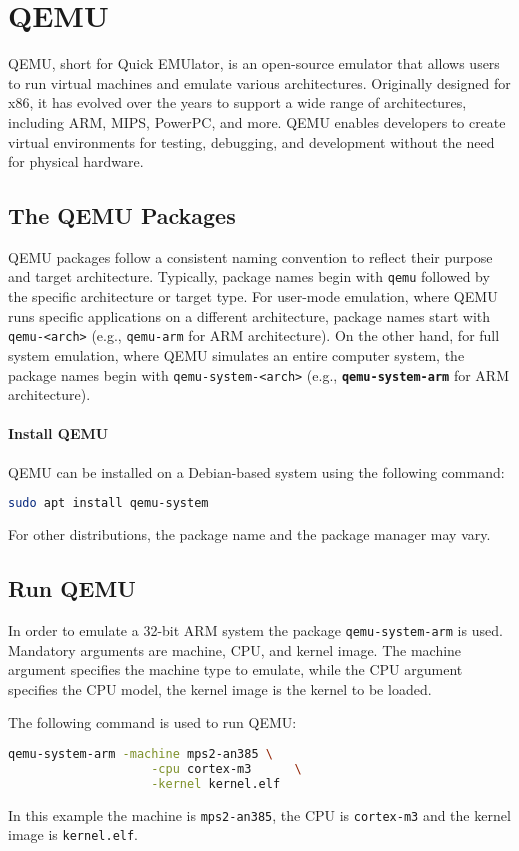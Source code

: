 \section{QEMU}
QEMU, short for Quick EMUlator, is an open-source emulator that allows users to run virtual machines and emulate various architectures. Originally designed for x86, it has evolved over the years to support a wide range of architectures, including ARM, MIPS, PowerPC, and more. QEMU enables developers to create virtual environments for testing, debugging, and development without the need for physical hardware.

\subsection{The QEMU Packages}
QEMU packages follow a consistent naming convention to reflect their purpose and target architecture. Typically, package names begin with \texttt{qemu} followed by the specific architecture or target type. For user-mode emulation, where QEMU runs specific applications on a different architecture, package names start with \texttt{qemu-<arch>} (e.g., \texttt{qemu-arm} for ARM architecture). On the other hand, for full system emulation, where QEMU simulates an entire computer system, the package names begin with \texttt{qemu-system-<arch>} (e.g., \texttt{\textbf{qemu-system-arm}} for ARM architecture).

\paragraph{Install QEMU}
QEMU can be installed on a Debian-based system using the following command:
\begin{lstlisting}[language=bash]
    sudo apt install qemu-system
\end{lstlisting}
For other distributions, the package name and the package manager may vary.

\subsection{Run QEMU}
In order to emulate a 32-bit ARM system the package \texttt{qemu-system-arm} is used. Mandatory arguments are machine, CPU, and kernel image. The machine argument specifies the machine type to emulate, while the CPU argument specifies the CPU model, the kernel image is the kernel to be loaded.

\vspace{\baselineskip}

The following command is used to run QEMU:
\begin{lstlisting}[language=bash]
    qemu-system-arm -machine mps2-an385 \
                    -cpu cortex-m3      \
                    -kernel kernel.elf
\end{lstlisting}

In this example the machine is \texttt{mps2-an385}, the CPU is \texttt{cortex-m3} and the kernel image is \texttt{kernel.elf}.